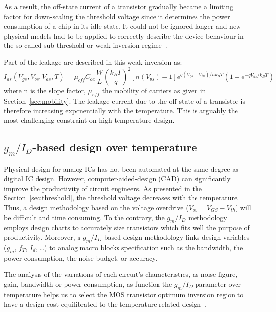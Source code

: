 As a result, the off-state current of a transistor gradually became a limiting factor for down-scaling the threshold voltage since it determines the power consumption of a chip in its idle state. It could not be ignored longer and new physical models had to be applied to correctly describe the device behaviour in the so-called sub-threshold or weak-inversion regime~\cite{Cheng21997,Enz1995,Joardar1998}.

Part of the leakage are described in this weak-inversion as:
\begin{equation}
\label{eqn:ids_leakage}
I_{ds}(V_{gs}, V_{bs}, V_{ds}, T) = \mu_{eff} C_{ox} \frac{W}{L} {\left(\frac{k_B T}{q}\right)}^2 [n(V_{bs})-1] e^{q(V_{gs}-V_{th})/nk_B T} \left(1-e^{-qV_{ds}/k_B T} \right)
\end{equation}
where n is the slope factor, \(\mu_{eff} \) the mobility of carriers as given in Section~\ref{sec:mobility}. The leakage current due to the off state of a transistor is therefore increasing exponentially with the temperature. This is arguably the most challenging constraint on high temperature design.

\subsection{\(g_m/I_{D} \)-based design over temperature} %
\label{sec:analog-insight}
Physical design for analog ICs has not been automated at the same degree as digital IC design. However, computer-aided-design (CAD) can significantly improve the productivity of circuit engineers. As presented in the Section~\ref{sec:threshold}, the threshold voltage decreases with the temperature. Thus, a design methodology based on the voltage overdrive ($V_{ov} = V_{GS}-V_{th}$) will be difficult and time consuming. To the contrary, the \(g_m/I_{D} \) methodology employs design charts to accurately size transistors which fits well the purpose of productivity. Moreover, a \(g_m/I_{D} \)-based design methodology links design variables (\(g_m \), \(f_T \), \(I_d \), \ldots) to analog macro blocks specification such as the bandwidth, the power consumption, the noise budget, or accuracy.

The analysis of the variations of each circuit's characteristics, as noise figure, gain, bandwidth or power consumption, as function the \(g_m/I_{D} \) parameter over temperature helps us to select the MOS transistor optimum inversion region to have a design cost equilibrated to the temperature related design~\cite{Silveira1996,Ou2014,Ou2017,Ou2018}.

